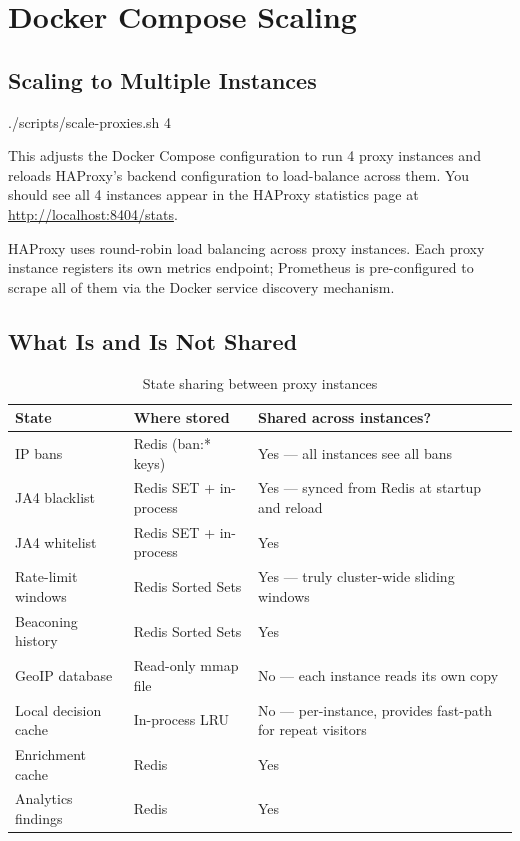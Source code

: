 \section{Docker Compose Scaling}

\subsection{Scaling to Multiple Instances}

\begin{bashcode}
./scripts/scale-proxies.sh 4
\end{bashcode}

This adjusts the Docker Compose configuration to run 4 proxy instances and
reloads HAProxy's backend configuration to load-balance across them. You should
see all 4 instances appear in the HAProxy statistics page at
\url{http://localhost:8404/stats}.

HAProxy uses round-robin load balancing across proxy instances. Each proxy
instance registers its own metrics endpoint; Prometheus is pre-configured
to scrape all of them via the Docker service discovery mechanism.

\subsection{What Is and Is Not Shared}

\begin{table}[ht]
  \small
  \begin{tabularx}{\linewidth}{lXl}
    \toprule
    \textbf{State} & \textbf{Where stored} & \textbf{Shared across instances?} \\
    \midrule
    IP bans & Redis (ban:* keys) & Yes — all instances see all bans \\
    JA4 blacklist & Redis SET + in-process & Yes — synced from Redis at startup and reload \\
    JA4 whitelist & Redis SET + in-process & Yes \\
    Rate-limit windows & Redis Sorted Sets & Yes — truly cluster-wide sliding windows \\
    Beaconing history & Redis Sorted Sets & Yes \\
    GeoIP database & Read-only mmap file & No — each instance reads its own copy \\
    Local decision cache & In-process LRU & No — per-instance, provides fast-path for repeat visitors \\
    Enrichment cache & Redis & Yes \\
    Analytics findings & Redis & Yes \\
    \bottomrule
  \end{tabularx}
  \caption{State sharing between proxy instances}
\end{table}

